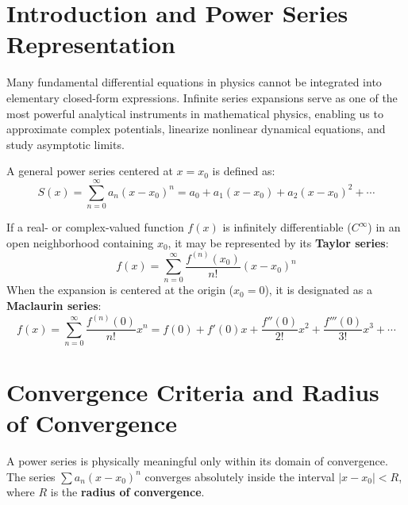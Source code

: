 \section{Introduction and Power Series Representation}
Many fundamental differential equations in physics cannot be integrated into elementary closed-form expressions. Infinite series expansions serve as one of the most powerful analytical instruments in mathematical physics, enabling us to approximate complex potentials, linearize nonlinear dynamical equations, and study asymptotic limits.

A general power series centered at $x = x_0$ is defined as:
\begin{equation}
S(x) = \sum_{n=0}^{\infty} a_n (x - x_0)^n = a_0 + a_1(x - x_0) + a_2(x - x_0)^2 + \cdots
\end{equation}

\begin{maththeorem}
If a real- or complex-valued function $f(x)$ is infinitely differentiable ($C^\infty$) in an open neighborhood containing $x_0$, it may be represented by its \textbf{Taylor series}:
\begin{equation}
f(x) = \sum_{n=0}^{\infty} \frac{f^{(n)}(x_0)}{n!}(x - x_0)^n
\end{equation}
When the expansion is centered at the origin ($x_0 = 0$), it is designated as a \textbf{Maclaurin series}:
\begin{equation}
f(x) = \sum_{n=0}^{\infty} \frac{f^{(n)}(0)}{n!}x^n = f(0) + f'(0)x + \frac{f''(0)}{2!}x^2 + \frac{f'''(0)}{3!}x^3 + \cdots
\end{equation}
\end{maththeorem}

\section{Convergence Criteria and Radius of Convergence}
A power series is physically meaningful only within its domain of convergence. The series $\sum a_n (x - x_0)^n$ converges absolutely inside the interval $|x - x_0| < R$, where $R$ is the \textbf{radius of convergence}.

